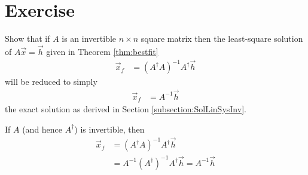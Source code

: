 \section{Exercise}

\begin{Exercise}
Show that if $A$ is an invertible $n \times n$ square matrix then the least-square solution of $A\vec{x} = \vec{h}$ given in Theorem \ref{thm:bestfit}
\begin{align*}
\vec{x}_f &= (A^\dag A)^{-1}A^\dag \vec{h}    
\end{align*}
will be reduced to simply
\begin{align*}
\vec{x}_f &= A^{-1}\vec{h}    
\end{align*}
the exact solution as derived in Section \ref{subsection:SolLinSysInv}.
\end{Exercise}
\begin{Answer}
If $A$ (and hence $A^\dag$) is invertible, then
\begin{align*}
\vec{x}_f &= (A^\dag A)^{-1}A^\dag \vec{h} \\
&= A^{-1}(A^\dag)^{-1}A^\dag \vec{h} = A^{-1}\vec{h}  
\end{align*}
\end{Answer}

